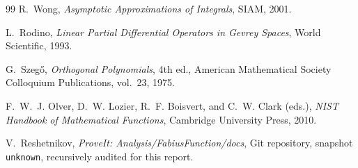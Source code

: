 \documentclass[11pt,oneside]{article}
\theoremstyle{definition}
\theoremstyle{remark}
\newcommand{\RepoCommit}{\texttt{unknown}}
\begin{document}
\begin{thebibliography}{99}
R.~Wong,
\newblock \emph{Asymptotic Approximations of Integrals},
\newblock SIAM, 2001.

L.~Rodino,
\newblock \emph{Linear Partial Differential Operators in Gevrey Spaces},
\newblock World Scientific, 1993.

G.~Szeg\H{o},
\newblock \emph{Orthogonal Polynomials}, 4th ed.,
\newblock American Mathematical Society Colloquium Publications, vol.~23, 1975.

F.~W.~J. Olver, D.~W. Lozier, R.~F. Boisvert, and C.~W. Clark (eds.),
\newblock \emph{NIST Handbook of Mathematical Functions},
\newblock Cambridge University Press, 2010.

V.~Reshetnikov,
\newblock \emph{ProveIt: Analysis/FabiusFunction/docs},
\newblock Git repository, snapshot \RepoCommit, recursively audited for this report.

\end{thebibliography}
\end{document}
